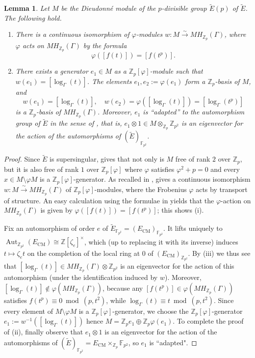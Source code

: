 \documentclass{amsart}
\newcommand{\op}[1]{\operatorname{#1}}
\newtheorem{lemma}[theorem]{Lemma}
\theoremstyle{definition}
\newcommand{\Z}{\mathbb{Z}}
\newcommand{\F}{\mathbb{F}}
\newcommand{\Frob}{\varphi}
\numberwithin{theorem}{section}
\numberwithin{equation}{section}
\begin{document}
\begin{lemma}\label{lemma: adapted generator}
Let $M$ be the Dieudonné module of the $p$-divisible group $\tilde{E}(p)$ of $\tilde{E}$. The following hold.
\begin{enumerate}
    \item There is a continuous isomorphism of $\varphi$-modules $w : M \xrightarrow{\sim} MH_{\Z_p}(\Gamma)$, where $\varphi$ acts on $MH_{\Z_p}(\Gamma)$ by the formula
    \[
    \varphi([f(t)])=[f(t^p)].
    \]
    \item There exists a generator $e_1 \in M$ as a $\Z_p[\varphi]$-module such that $w(e_1)=[\log_\Gamma(t)]$. The elements $e_1, e_2 := \varphi(e_1)$ form a $\Z_p$-basis of $M$, and
    \[
    w(e_1) = [\log_\Gamma(t)], \quad w(e_2)=\varphi([\log_\Gamma(t)])=[\log_\Gamma(t^p)]
    \]
    is a $\Z_p$-basis of $MH_{\Z_p}(\Gamma)$. Moreover, $e_1$ is ``adapted'' to the automorphism group of $\tilde{E}$ in the sense of \cite[p.~91]{Volkov}, that is, $e_1 \otimes 1 \in M \otimes_{\Z_p} \Z_{p^2}$ is an eigenvector for the action of the automorphisms of $(\tilde{E})_{\F_{p^2}}$.
\end{enumerate}
\end{lemma}


\begin{proof}
Since $\tilde E$ is supersingular, \cite[p.~86]{VolkovArticle} gives that not only is $M$ free of rank $2$ over $\Z_p$, but it is also free of rank $1$ over $\Z_p[\varphi]$ where $\varphi$ satisfies $\varphi^2+p=0$ and every $x \in M \setminus \varphi M$ is a $\Z_p[\varphi]$-generator. As recalled in \cite[p.~695]{Kawachi}, \cite[III, Proposition 6.5]{Fontaine-p-divisible} gives a continuous isomorphism $w:M\xrightarrow{\sim} MH_{\Z_p}(\Gamma)$ of $\Z_p[\Frob]$-modules, where the Frobenius $\Frob$ acts by transport of structure. An easy calculation using the formulae in \cite[p.~695]{Kawachi} yields that the $\varphi$-action on $MH_{\Z_p}(\Gamma)$ is given by $\varphi([f(t)])=[f(t^p)]$; this shows (i).

Fix an automorphism of order $e$ of $\tilde{E}_{\F_{p^2}} = (E_{\mathrm{CM}})_{\F_{p^2}}$. It lifts uniquely to $\op{Aut}_{\Z_{p^2}}(E_{\mathrm{CM}}) \cong \Z[\zeta_e]^{\times}$, which (up to replacing it with its inverse) induces $t \mapsto \zeta_e t$ on the completion of the local ring at $0$ of $(E_{\mathrm{CM}})_{\Z_{p^2}}$. By (iii) we thus see that $[\log_\Gamma(t)] \in MH_{\Z_p}(\Gamma) \otimes \Z_{p^2}$ is an eigenvector for the action of this automorphism (under the identification induced by $w$). Moreover, $[\log_\Gamma(t)] \not\in \varphi(MH_{\Z_p}(\Gamma))$, because any $[f(t^p)] \in \varphi(MH_{\Z_p}(\Gamma))$ satisfies $f(t^p) \equiv 0 \bmod ({p, t^2})$, while $\log_{\Gamma}(t) \equiv t \bmod ({p, t^2})$. Since every element of $M \setminus \varphi M$ is a $\Z_p[\varphi]$-generator, we choose the $\Z_p[\varphi]$-generator $e_1:=w^{-1}([\log_{\Gamma}(t)])$ hence $M=\Z_pe_1 \oplus \Z_p\varphi(e_1)$. To complete the proof of (ii), finally observe that $e_1 \otimes 1$ is an eigenvector for the action of the automorphisms of $(\tilde{E})_{\F_{p^2}} = E_{\mathrm{CM}} \times_{\Z_p} \F_{p^2}$, so $e_1$ is ``adapted".
\end{proof}
\end{document}
